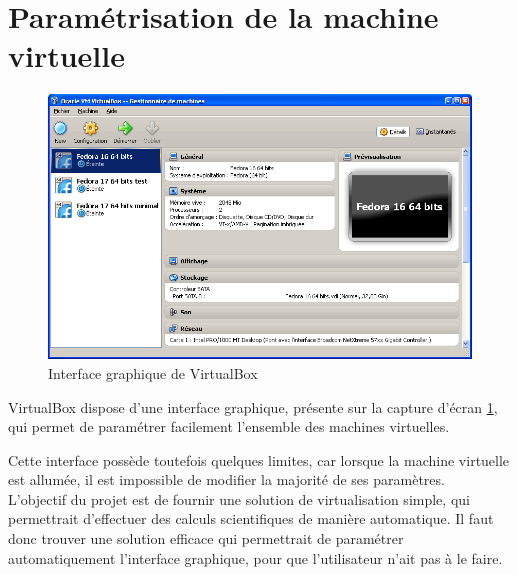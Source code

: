 \section{Paramétrisation de la machine virtuelle}
\label{Paramétrisation de la machine virtuelle}

\begin{figure}[!h]
	\center
	\includegraphics[scale=0.5]{images/VirtualBox.png}
	\caption{Interface graphique de VirtualBox}
	\label{Interface graphique de VirtualBox}
\end{figure}

VirtualBox dispose d'une interface graphique, présente sur la capture d'écran \ref{Interface graphique de VirtualBox}, qui permet de paramétrer facilement l'ensemble des machines virtuelles.

Cette interface possède toutefois quelques limites, car lorsque la machine virtuelle est allumée, il est impossible de modifier la majorité de ses paramètres.
\\


L'objectif du projet est de fournir une solution de virtualisation simple, qui permettrait d'effectuer des calculs scientifiques de manière automatique.
Il faut donc trouver une solution efficace qui permettrait de paramétrer automatiquement l'interface graphique, pour que l'utilisateur n'ait pas à le faire.
\\





